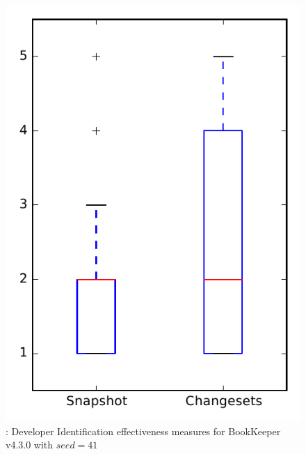 
\begin{figure}
\centering
\includegraphics[height=0.4\textheight]{figures/dit_seed/rq1_bookkeeper_41}
\caption{\rtwo: Developer Identification effectiveness measures for BookKeeper v4.3.0 with $seed=41$}
\label{fig:dit_seed:rq1:bookkeeper}
\end{figure}
